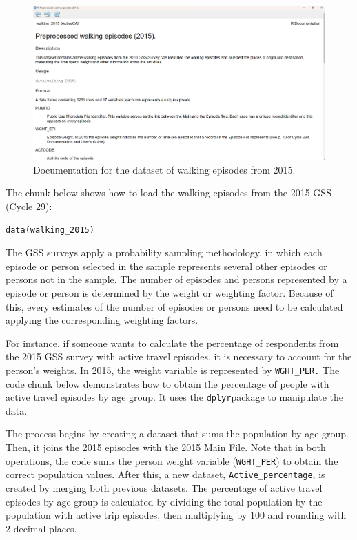 \documentclass[Royal,times,sageh]{sagej}
\begin{document}
\begin{figure}

{\centering \includegraphics[width=1\linewidth]{Manuscript-figures/walking-2015-documentation} 

}

\caption{Documentation for the dataset of walking episodes from 2015.}\label{fig:walking_documentation}
\end{figure}

The chunk below shows how to load the walking episodes from the 2015 GSS
(Cycle 29):

\begin{verbatim}
data(walking_2015)
\end{verbatim}

The GSS surveys apply a probability sampling methodology, in which each
episode or person selected in the sample represents several other
episodes or persons not in the sample. The number of episodes and
persons represented by a episode or person is determined by the weight
or weighting factor. Because of this, every estimates of the number of
episodes or persons need to be calculated applying the corresponding
weighting factors.

For instance, if someone wants to calculate the percentage of
respondents from the 2015 GSS survey with active travel episodes, it is
necessary to account for the person's weights. In 2015, the weight
variable is represented by \texttt{WGHT\_PER.} The code chunk below
demonstrates how to obtain the percentage of people with active travel
episodes by age group. It uses the \texttt{dplyr}package
\citep{dplyr2023} to manipulate the data.

The process begins by creating a dataset that sums the population by age
group. Then, it joins the 2015 episodes with the 2015 Main File. Note
that in both operations, the code sums the person weight variable
(\texttt{WGHT\_PER}) to obtain the correct population values. After
this, a new dataset, \texttt{Active\_percentage}, is created by merging
both previous datasets. The percentage of active travel episodes by age
group is calculated by dividing the total population by the population
with active trip episodes, then multiplying by 100 and rounding with 2
decimal places.
\end{document}
